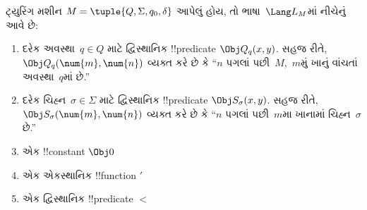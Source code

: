 \documentclass[../../../include/open-logic-section]{subfiles}
\begin{document}
\begin{defn}
ટ્યુરિંગ મશીન $M = \tuple{Q, \Sigma, q_0, \delta}$
આપેલું હોય, તો ભાષા~$\Lang L_M$માં નીચેનું આવે છે:
\begin{enumerate}
\item દરેક અવસ્થા~$q \in Q$ માટે દ્વિસ્થાનિક
  !!{predicate} $\Obj Q_q(x, y)$. સહજ રીતે,
  $\Obj Q_q(\num{m}, \num{n})$ વ્યક્ત કરે છે કે
  ``$n$ પગલાં પછી~$M$,~$m$મું ખાનું વાંચતાં
  અવસ્થા~$q$માં છે.''
\item દરેક ચિહ્ન~$\sigma\in \Sigma$ માટે દ્વિસ્થાનિક
  !!{predicate} $\Obj S_\sigma(x, y)$. સહજ રીતે,
  $\Obj S_\sigma(\num{m}, \num{n})$ વ્યક્ત કરે છે કે
  ``$n$ પગલાં પછી~$m$મા ખાનામાં ચિહ્ન~$\sigma$ છે.''
\item એક !!{constant} $\Obj 0$
\item એક એકસ્થાનિક !!{function} $\prime$
\item એક દ્વિસ્થાનિક !!{predicate} $<$
\end{enumerate}
\end{defn}
\end{document}
